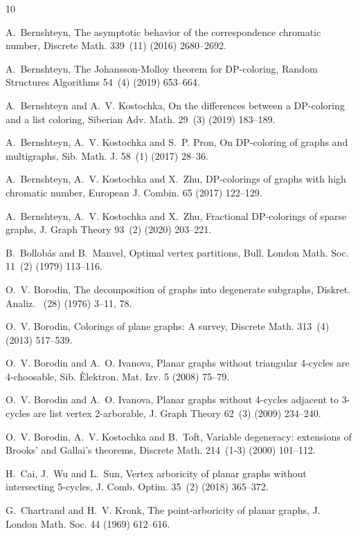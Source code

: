 \documentclass{article}
\theoremstyle{definition}
\begin{document}
\begin{thebibliography}{10}

A.~Bernshteyn, The asymptotic behavior of the correspondence chromatic number,
  Discrete Math. 339~(11) (2016) 2680--2692.

A.~Bernshteyn, The {J}ohansson-{M}olloy theorem for {DP}-coloring, Random
  Structures Algorithms 54~(4) (2019) 653--664.

A.~Bernshteyn and A.~V. Kostochka, On the differences between a {DP}-coloring
  and a list coloring, Siberian Adv. Math. 29~(3) (2019) 183--189.

A.~Bernshteyn, A.~V. Kostochka and S.~P. Pron, On {DP}-coloring of graphs and
  multigraphs, Sib. Math. J. 58~(1) (2017) 28--36.

A.~Bernshteyn, A.~V. Kostochka and X.~Zhu, D{P}-colorings of graphs with high
  chromatic number, European J. Combin. 65 (2017) 122--129.

A.~Bernshteyn, A.~V. Kostochka and X.~Zhu, Fractional {DP}-colorings of sparse
  graphs, J. Graph Theory 93~(2) (2020) 203--221.

B.~Bollob\'as and B.~Manvel, Optimal vertex partitions, Bull. London Math. Soc.
  11~(2) (1979) 113--116.

O.~V. Borodin, The decomposition of graphs into degenerate subgraphs, Diskret.
  Analiz. ~(28) (1976) 3--11, 78.

O.~V. Borodin, Colorings of plane graphs: {A} survey, Discrete Math. 313~(4)
  (2013) 517--539.

O.~V. Borodin and A.~O. Ivanova, Planar graphs without triangular 4-cycles are
  4-choosable, Sib. \`Elektron. Mat. Izv. 5 (2008) 75--79.

O.~V. Borodin and A.~O. Ivanova, Planar graphs without 4-cycles adjacent to
  3-cycles are list vertex 2-arborable, J. Graph Theory 62~(3) (2009) 234--240.

O.~V. Borodin, A.~V. Kostochka and B.~Toft, Variable degeneracy: extensions of
  {B}rooks' and {G}allai's theorems, Discrete Math. 214~(1-3) (2000) 101--112.

H.~Cai, J.~Wu and L.~Sun, Vertex arboricity of planar graphs without
  intersecting 5-cycles, J. Comb. Optim. 35~(2) (2018) 365--372.

G.~Chartrand and H.~V. Kronk, The point-arboricity of planar graphs, J. London
  Math. Soc. 44 (1969) 612--616.


\end{thebibliography}
\end{document}
